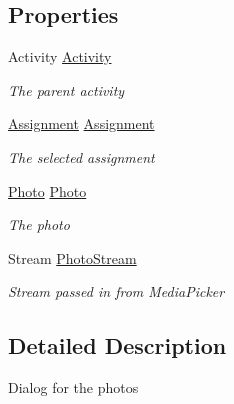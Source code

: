 \subsection*{Properties}
\begin{DoxyCompactItemize}
\item 
Activity \hyperlink{class_field_service_1_1_android_1_1_dialogs_1_1_photo_dialog_a2540d4a80bb5309d8ff3b4f17b86a73b}{Activity}
\begin{DoxyCompactList}\small\item\em The parent activity \end{DoxyCompactList}\item 
\hyperlink{class_field_service_1_1_data_1_1_assignment}{Assignment} \hyperlink{class_field_service_1_1_android_1_1_dialogs_1_1_photo_dialog_a0df58e377c78f25326a9b8a101e2bcc3}{Assignment}
\begin{DoxyCompactList}\small\item\em The selected assignment \end{DoxyCompactList}\item 
\hyperlink{class_field_service_1_1_data_1_1_photo}{Photo} \hyperlink{class_field_service_1_1_android_1_1_dialogs_1_1_photo_dialog_a3ee1670ba9565e1695d898908aa7f8f8}{Photo}
\begin{DoxyCompactList}\small\item\em The photo \end{DoxyCompactList}\item 
Stream \hyperlink{class_field_service_1_1_android_1_1_dialogs_1_1_photo_dialog_adccf035208f9cf547bc6fd484a721558}{Photo\+Stream}
\begin{DoxyCompactList}\small\item\em Stream passed in from Media\+Picker \end{DoxyCompactList}\end{DoxyCompactItemize}


\subsection{Detailed Description}
Dialog for the photos 



